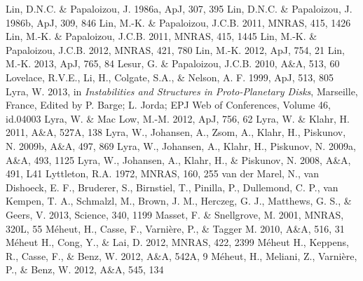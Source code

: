 \documentclass[apj]{emulateapj}
\begin{document}
\begin{thebibliography}{}
 Lin, D.N.C. \& Papaloizou, J. 1986a, ApJ, 307, 395
 Lin, D.N.C. \& Papaloizou, J. 1986b, ApJ, 309, 846
 Lin, M.-K. \& Papaloizou, J.C.B. 2011, MNRAS, 415, 1426
 Lin, M.-K. \& Papaloizou, J.C.B. 2011, MNRAS, 415, 1445
 Lin, M.-K. \& Papaloizou, J.C.B. 2012, MNRAS, 421, 780
 Lin, M.-K. 2012, ApJ, 754, 21
 Lin, M.-K. 2013, ApJ, 765, 84
 Lesur, G. \& Papaloizou, J.C.B. 2010, A\&A, 513, 60
 Lovelace, R.V.E., Li, H., Colgate, S.A., \& Nelson, A. F. 1999, ApJ, 513, 805
 Lyra, W. 2013, in {\it Instabilities and Structures in Proto-Planetary Disks}, Marseille, France, Edited by P. Barge; L. Jorda; EPJ Web of Conferences, Volume 46, id.04003 
 Lyra, W. \& Mac Low, M.-M. 2012, ApJ, 756, 62
 Lyra, W. \& Klahr,  H. 2011, A\&A, 527A, 138
 Lyra, W., Johansen, A., Zsom, A., Klahr, H., Piskunov, N. 2009b, A\&A, 497, 869
 Lyra, W., Johansen, A., Klahr, H., Piskunov, N. 2009a, A\&A, 493, 1125 
 Lyra, W., Johansen, A., Klahr, H., \& Piskunov, N. 2008, A\&A, 491, L41
 Lyttleton, R.A. 1972, MNRAS, 160, 255
 van der Marel,
  N., van Dishoeck, E. F., Bruderer, S., Birnstiel, T., Pinilla, P.,
  Dullemond, C. P., van Kempen, T. A., Schmalzl, M., Brown, J. M., Herczeg, G. J., Matthews, G. S., \& Geers, V. 2013, Science, 340, 1199
 Masset, F. \& Snellgrove, M. 2001, MNRAS, 320L, 55
 M\'eheut, H., Casse, F., Varni\`ere, P., \& Tagger M. 2010, A\&A, 516, 31
 M\'eheut H., Cong, Y., \& Lai, D. 2012, MNRAS, 422, 2399
 M\'eheut H., Keppens,  R., Casse, F., \& Benz, W. 2012, A\&A, 542A, 9
 M\'eheut, H., Meliani, Z., Varni\`ere, P., \& Benz, W. 2012, A\&A, 545, 134

\end{thebibliography}
\end{document}

